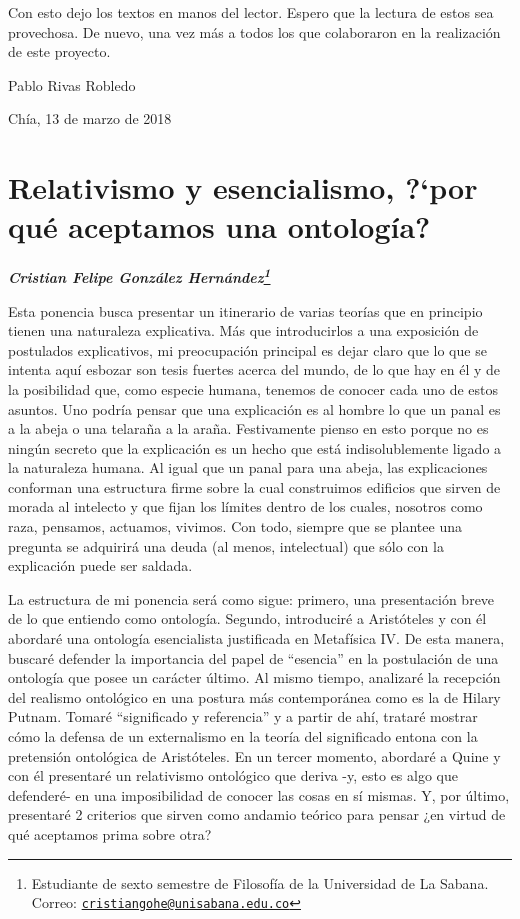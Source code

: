\documentclass[]{book}
\newcommand{\autor}[1]{            %
  \begin{center}                   %
    \vspace*{-3.5em}               %
    \textbf{\textit{\large #1}}    %
    \vspace*{+4em}                 %
  \end{center}
}
\begin{document}
Con esto dejo los textos en manos del lector. Espero que la lectura de
estos sea provechosa. De nuevo, una vez más a todos los que colaboraron
en la realización de este proyecto.

\begin{flushright}
	Pablo Rivas Robledo

Chía, 13 de marzo de 2018
\end{flushright}

\chapter{\texorpdfstring{\textbf{Relativismo y esencialismo, ?`por qué
aceptamos una
ontología?}}{Relativismo y esencialismo, ?`por qué aceptamos una ontología?}}\label{relativismo-y-esencialismo-por-quuxe9-aceptamos-una-ontologuxeda}

\autor{Cristian Felipe González Hernández\footnote{Estudiante de sexto
  semestre de Filosofía de la Universidad de La Sabana. Correo:
  \href{mailto:cristiangohe@unisabana.edu.co}{\nolinkurl{cristiangohe@unisabana.edu.co}}}}

Esta ponencia busca presentar un itinerario de varias teorías que en
principio tienen una naturaleza explicativa. Más que introducirlos a una
exposición de postulados explicativos, mi preocupación principal es
dejar claro que lo que se intenta aquí esbozar son tesis fuertes acerca
del mundo, de lo que hay en él y de la posibilidad que, como especie
humana, tenemos de conocer cada uno de estos asuntos. Uno podría pensar
que una explicación es al hombre lo que un panal es a la abeja o una
telaraña a la araña. Festivamente pienso en esto porque no es ningún
secreto que la explicación es un hecho que está indisolublemente ligado
a la naturaleza humana. Al igual que un panal para una abeja, las
explicaciones conforman una estructura firme sobre la cual construimos
edificios que sirven de morada al intelecto y que fijan los límites
dentro de los cuales, nosotros como raza, pensamos, actuamos, vivimos.
Con todo, siempre que se plantee una pregunta se adquirirá una deuda (al
menos, intelectual) que sólo con la explicación puede ser saldada.

La estructura de mi ponencia será como sigue: primero, una presentación
breve de lo que entiendo como ontología. Segundo, introduciré a
Aristóteles y con él abordaré una ontología esencialista justificada en
Metafísica IV. De esta manera, buscaré defender la importancia del papel
de ``esencia'' en la postulación de una ontología que posee un carácter
último. Al mismo tiempo, analizaré la recepción del realismo ontológico
en una postura más contemporánea como es la de Hilary Putnam. Tomaré
``significado y referencia'' y a partir de ahí, trataré mostrar cómo la
defensa de un externalismo en la teoría del significado entona con la
pretensión ontológica de Aristóteles. En un tercer momento, abordaré a
Quine y con él presentaré un relativismo ontológico que deriva -y, esto
es algo que defenderé- en una imposibilidad de conocer las cosas en sí
mismas. Y, por último, presentaré 2 criterios que sirven como andamio
teórico para pensar ¿en virtud de qué aceptamos prima sobre otra?
\end{document}
